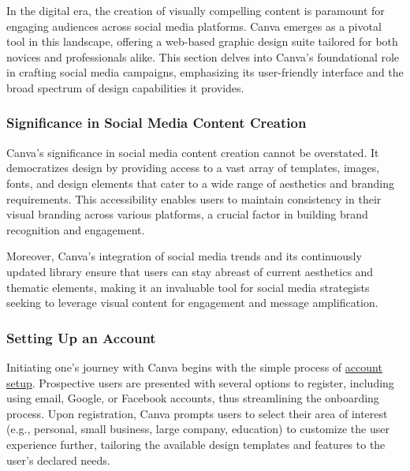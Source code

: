 \documentclass[
]{book}
\begin{document}
In the digital era, the creation of visually compelling content is paramount for engaging audiences across social media platforms. Canva emerges as a pivotal tool in this landscape, offering a web-based graphic design suite tailored for both novices and professionals alike. This section delves into Canva's foundational role in crafting social media campaigns, emphasizing its user-friendly interface and the broad spectrum of design capabilities it provides.

\hypertarget{significance-in-social-media-content-creation}{%
\subsubsection*{Significance in Social Media Content Creation}\label{significance-in-social-media-content-creation}}

Canva's significance in social media content creation cannot be overstated. It democratizes design by providing access to a vast array of templates, images, fonts, and design elements that cater to a wide range of aesthetics and branding requirements. This accessibility enables users to maintain consistency in their visual branding across various platforms, a crucial factor in building brand recognition and engagement.

Moreover, Canva's integration of social media trends and its continuously updated library ensure that users can stay abreast of current aesthetics and thematic elements, making it an invaluable tool for social media strategists seeking to leverage visual content for engagement and message amplification.

\hypertarget{setting-up-an-account}{%
\subsubsection*{Setting Up an Account}\label{setting-up-an-account}}

Initiating one's journey with Canva begins with the simple process of \href{https://www.canva.com/login/}{account setup}. Prospective users are presented with several options to register, including using email, Google, or Facebook accounts, thus streamlining the onboarding process. Upon registration, Canva prompts users to select their area of interest (e.g., personal, small business, large company, education) to customize the user experience further, tailoring the available design templates and features to the user's declared needs.
\end{document}
